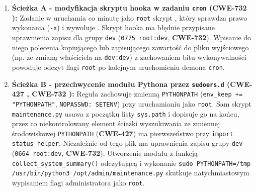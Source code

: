 \begin{enumerate}
    \item \textbf{Ścieżka A - modyfikacja skryptu hooka w zadaniu \texttt{cron} (CWE-732 \cite{cwe732}):} Zadanie w  uruchamia co minutę jako \texttt{root} skrypt , który sprawdza prawo wykonania (\texttt{-x}) i wywołuje . Skrypt hooka ma błędnie przypisane uprawnienia zapisu dla grupy \texttt{dev} (\texttt{0775 root:dev}, \textbf{CWE-732}). Wpisanie do niego polecenia kopiującego lub zapisującego zawartość  do pliku wyjściowego (np.  ze zmianą właściciela na \texttt{dev:dev}) z zachowaniem bitu wykonywalności powoduje odczyt flagi \texttt{root} po kolejnym uruchomieniu demona \texttt{cron}.
    \item \textbf{Ścieżka B - przechwycenie modułu Pythona przez \texttt{sudoers.d} (CWE-427 \cite{cwe427}, CWE-732 \cite{cwe732}):} Reguła  \cite{sudoers} zachowuje zmienną \texttt{PYTHONPATH} (\texttt{env\_keep += "PYTHONPATH"}, \texttt{NOPASSWD: SETENV}) przy uruchamianiu  jako \texttt{root}. Sam skrypt \texttt{maintenance.py} usuwa  z początku listy \texttt{sys.path} i dopisuje go na końcu, przez co niekontrolowany element ścieżki wyszukiwania ze zmiennej środowiskowej \texttt{PYTHONPATH} (\textbf{CWE-427}) ma pierwszeństwo przy \texttt{import status\_helper}. Niezależnie od tego plik  ma uprawnienia zapisu grupy \texttt{dev} (\texttt{0664 root:dev}, \textbf{CWE-732}). Utworzenie modułu  z funkcją \texttt{collect\_system\_summary()} odczytującą  i wykonanie \texttt{sudo PYTHONPATH=/tmp /usr/bin/python3 /opt/admin/maintenance.py} skutkuje natychmiastowym wypisaniem flagi administratora jako \texttt{root}.
\end{enumerate}
